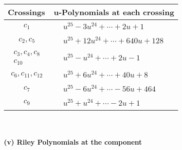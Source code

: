 \documentclass[1p]{elsarticle_modified}
\theoremstyle{definition}
\begin{document}
\begin{tabular}{m{50pt}|m{274pt}}
Crossings & \hspace{64pt}u-Polynomials at each crossing \\
\hline $$\begin{aligned}c_{1}\end{aligned}$$&$\begin{aligned}
&u^{25}-3 u^{24}+\cdots+2 u+1
\end{aligned}$\\
\hline $$\begin{aligned}c_{2},c_{5}\end{aligned}$$&$\begin{aligned}
&u^{25}+12 u^{24}+\cdots+640 u+128
\end{aligned}$\\
\hline $$\begin{aligned}c_{3},c_{4},c_{8}\\c_{10}\end{aligned}$$&$\begin{aligned}
&u^{25}- u^{24}+\cdots+2 u-1
\end{aligned}$\\
\hline $$\begin{aligned}c_{6},c_{11},c_{12}\end{aligned}$$&$\begin{aligned}
&u^{25}+6 u^{24}+\cdots+40 u+8
\end{aligned}$\\
\hline $$\begin{aligned}c_{7}\end{aligned}$$&$\begin{aligned}
&u^{25}-6 u^{24}+\cdots-56 u+464
\end{aligned}$\\
\hline $$\begin{aligned}c_{9}\end{aligned}$$&$\begin{aligned}
&u^{25}+u^{24}+\cdots-2 u+1
\end{aligned}$\\
\hline
\end{tabular}\\~\\
\newpage\renewcommand{\arraystretch}{1}
\flushleft \textbf{(v) Riley Polynomials at the component}\newline \\
\end{document}
